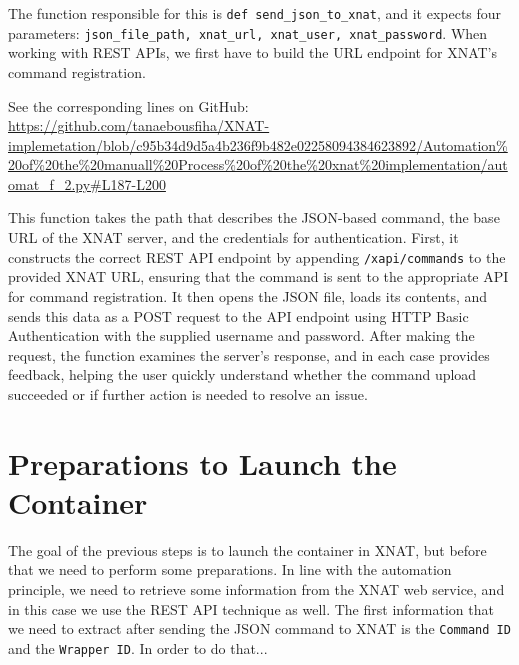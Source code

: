 The function responsible for this is \texttt{def send\_json\_to\_xnat}, and it expects four parameters: \texttt{json\_file\_path, xnat\_url, xnat\_user, xnat\_password}. When working with REST APIs, we first have to build the URL endpoint for XNAT’s command registration.
 


\noindent\footnotesize See the corresponding lines on GitHub:\url{ https://github.com/tanaebousfiha/XNAT-implemetation/blob/c95b34d9d5a4b236f9b482e02258094384623892/Automation%20of%20the%20manuall%20Process%20of%20the%20xnat%20implementation/automat_f_2.py#L187-L200}

This function takes the path that describes the JSON-based command, the base URL of the XNAT server, and the credentials for authentication. First, it constructs the correct REST API endpoint by appending \texttt{/xapi/commands} to the provided XNAT URL, ensuring that the command is sent to the appropriate API for command registration. It then opens the JSON file, loads its contents, and sends this data as a POST request to the API endpoint using \ac{HTTP} Basic Authentication with the supplied username and password. After making the request, the function examines the server’s response, and in each case provides feedback, helping the user quickly understand whether the command upload succeeded or if further action is needed to resolve an issue.

\section{Preparations to Launch the Container}

The goal of the previous steps is to launch the container in XNAT, but before that we need to perform some preparations. In line with the automation principle, we need to retrieve some information from the XNAT web service, and in this case we use the REST API technique as well. The first information that we need to extract after sending the JSON command to XNAT is the \texttt{Command ID} and the \texttt{Wrapper ID}.
In order to do that...
 



